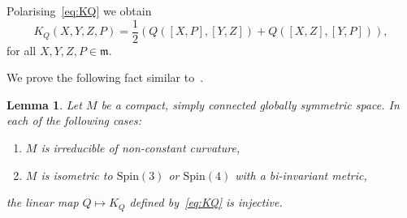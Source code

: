 \documentclass[10pt,a4paper]{amsart}
\newcommand \Spin{\mathrm{Spin}}
\newcommand\m{\mathfrak m}
\newcommand \<{\langle}
\renewcommand \>{\rangle}
\newtheorem{lemma}{Lemma}
\begin{document}
	Polarising~\eqref{eq:KQ} we obtain
	\begin{equation}\label{eq:KQpolar}
		K_Q(X,Y,Z,P) = \frac12 (Q([X,P],[Y,Z]) + Q([X,Z],[Y,P])),
	\end{equation}
	for all $X,Y,Z,P \in \m$.
	
We prove the following fact similar to~\cite[Corollary~3]{EL}.

	\begin{lemma} \label{l:nosyz}
		Let $M$ be a compact, simply connected globally symmetric space. In each of the following cases:
        \begin{enumerate}[label=\emph{(\roman*)},ref=\roman*]
          \item \label{it:nosyzirred}
          $M$ is irreducible of non-constant curvature,

          \item \label{it:nosyzSpin}
          $M$ is isometric to $\Spin(3)$ or $\Spin(4)$ with a bi-invariant metric,
        \end{enumerate}
        the linear map $Q \mapsto K_Q$ defined by~\eqref{eq:KQ} is injective.
	\end{lemma}
\end{document}
